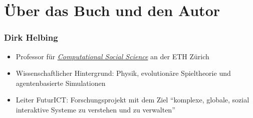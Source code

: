 \section{Über das Buch und den Autor}
\begin{frame}
	\frametitle{Dirk Helbing}
	\begin{itemize}
		\item
			Professor für \hyperlink{computational_soc}{\textit{Computational Social Science}} an der ETH Zürich
		\item
			Wissenschaftlicher Hintergrund: Physik, evolutionäre Spieltheorie und agentenbasierte Simulationen
		\item
			Leiter FuturICT: Forschungsprojekt mit dem Ziel \enquote{komplexe, globale, sozial interaktive Systeme zu verstehen und zu verwalten}
	\end{itemize}

\end{frame}




